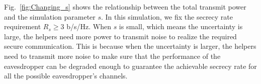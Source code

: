 \documentclass[12pt,journal,draftclsnofoot,onecolumn]{IEEEtran}
\begin{document}
Fig.~\ref{fig:Changing_s} shows  the relationship between the total transmit power and the simulation parameter $s$. In this simulation, we fix the secrecy rate requirement $R_s \geq 3 $ b/s/Hz. When $s$ is small, which means the uncertainty is large, the helpers need more power to transmit noise to realize the required secure communication. This is because when the uncertainty is larger, the helpers need to transmit more noise to make sure that the performance of the eavesdropper can be degraded enough to guarantee the achievable secrecy rate for all the possible eavesdropper's channels.

%

%
%
\end{document}
